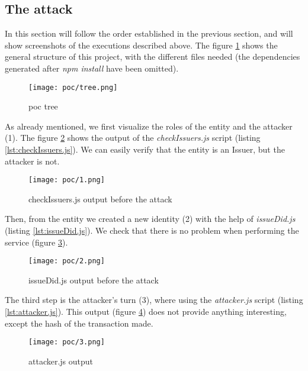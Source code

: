 \subsection{The attack}
        In this section will follow the order established in the previous section, and will show screenshots of the executions described above. The figure \ref{fig:poc-tree} shows the general structure of this project, with the different files needed (the dependencies generated after \textit{npm install} have been omitted).\\
        \begin{figure}[h]
            \centering
            \texttt{[image: poc/tree.png]}
            \caption{\acrshort{poc} tree}
            \label{fig:poc-tree}
        \end{figure}
        
        As already mentioned, we first visualize the roles of the entity and the attacker (1). The figure \ref{fig:poc-1} shows the output of the \textit{checkIssuers.js} script (listing \ref{lst:checkIssuers.js}). We can easily verify that the entity is an Issuer, but the attacker is not.\\
        \begin{figure}[h]
            \centering
            \texttt{[image: poc/1.png]}
            \caption{checkIssuers.js output before the attack}
            \label{fig:poc-1}
        \end{figure}
        
        Then, from the entity we created a new identity (2) with the help of \textit{issueDid.js} (listing \ref{lst:issueDid.js}). We check that there is no problem when performing the service (figure \ref{fig:poc-2}).\\
        \begin{figure}[h]
            \centering
            \texttt{[image: poc/2.png]}
            \caption{issueDid.js output before the attack}
            \label{fig:poc-2}
        \end{figure}
        
        The third step is the attacker's turn (3), where using the \textit{attacker.js} script (listing \ref{lst:attacker.js}). This output (figure \ref{fig:poc-3}) does not provide anything interesting, except the hash of the transaction made.\\
        \begin{figure}[h]
            \centering
            \texttt{[image: poc/3.png]}
            \caption{attacker.js output}
            \label{fig:poc-3}
        \end{figure}
        
